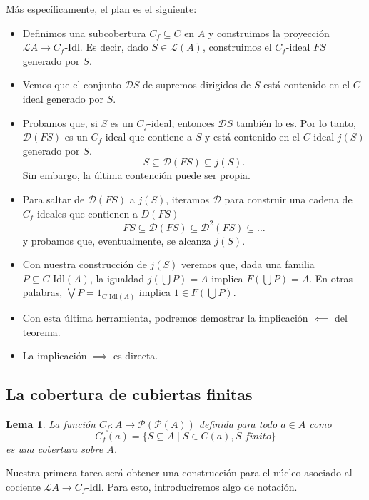 \documentclass[12pt,letterpaper,titlepage]{article}
\newtheorem{lemma}{Lema}
\theoremstyle{definition}
\newcommand\Sup{\bigvee}
\renewcommand\cal[1]{\mathcal{#1}}
\newcommand\<{\langle}
\renewcommand\>{\rangle}
\newcommand\Idl{\text{-}\mathrm{Idl}}
\begin{document}
Más específicamente, el plan es el siguiente:
\begin{itemize}
    \item
    Definimos una subcobertura $C_f\subseteq C$ en $A$ y
    construimos la proyección $\cal LA\to C_f\Idl$.
    Es decir, dado $S\in\cal L(A)$,
    construimos el $C_f$-ideal $FS$ generado por $S$.
    \item 
    Vemos que el conjunto $\cal DS$ de supremos dirigidos
    de $S$ está contenido en el $C$-ideal generado por $S$.
    \item
    Probamos que, si $S$ es un $C_f$-ideal, entonces
    $\cal DS$ también lo es.
    Por lo tanto, $\cal D(FS)$ es un $C_f$ ideal que
    contiene a $S$ y está contenido en el $C$-ideal $j(S)$
    generado por $S$.
    \[
        S\subseteq \cal D(FS) \subseteq j(S)
    .\]
    Sin embargo, la última contención puede ser propia.
    \item
    Para saltar de $\cal D(FS)$ a $j(S)$,
    iteramos $\cal D$ para construir una
    cadena de $C_f$-ideales que contienen a $D(FS)$
    \[
        FS\subseteq \cal D(FS) \subseteq \cal D^2(FS)
        \subseteq \dots
    \]
    y probamos que, eventualmente, se alcanza $j(S)$.
    \item
    Con nuestra construcción de $j(S)$ veremos
    que, dada una familia $P\subseteq C\Idl(A)$,
    la igualdad
    $j(\bigcup P)=A$ implica $F(\bigcup P)=A$.
    En otras palabras,
    $\Sup P = 1_{C\Idl(A)}$ implica $1\in F(\bigcup P)$.
    \item
    Con esta última herramienta, podremos demostrar
    la implicación $\impliedby$ del teorema.
    \item
    La implicación $\implies$ es directa.
\end{itemize}

\subsection{La cobertura de cubiertas finitas}

\begin{lemma}
La función $C_f:A\to\cal P(\cal P(A))$
definida para todo $a\in A$ como
\[C_f(a)=\{S\subseteq A\mid S\in C(a), S\textit{ finito}\}\]
es una cobertura sobre $A$.
\end{lemma}

Nuestra primera tarea será obtener una construcción para
el núcleo asociado al cociente $\cal LA\to C_f\Idl$.
Para esto, introduciremos algo de notación.
\end{document}
